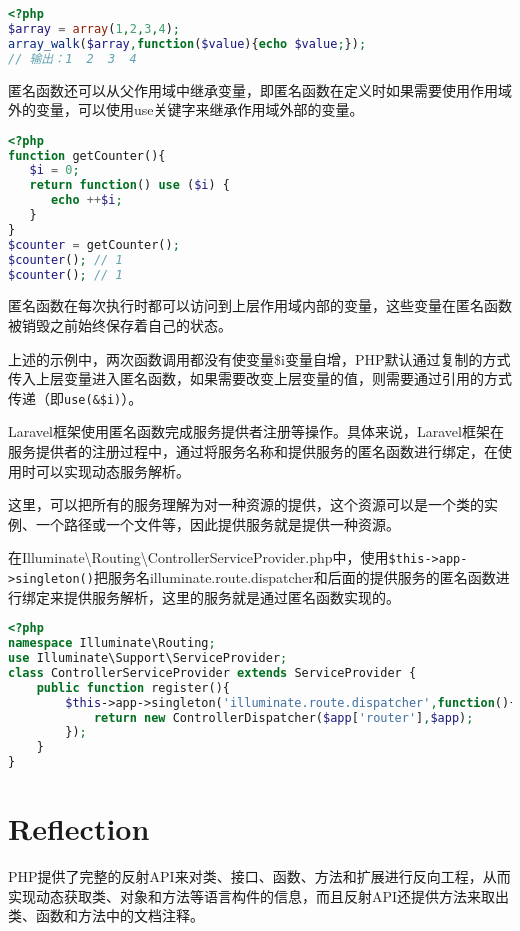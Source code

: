 \begin{lstlisting}[language=PHP]
<?php
$array = array(1,2,3,4);
array_walk($array,function($value){echo $value;});
// 输出：1  2  3  4
\end{lstlisting}

匿名函数还可以从父作用域中继承变量，即匿名函数在定义时如果需要使用作用域外的变量，可以使用use关键字来继承作用域外部的变量。

\begin{lstlisting}[language=PHP]
<?php
function getCounter(){
   $i = 0;
   return function() use ($i) {
      echo ++$i;
   }
}
$counter = getCounter();
$counter(); // 1
$counter(); // 1
\end{lstlisting}

匿名函数在每次执行时都可以访问到上层作用域内部的变量，这些变量在匿名函数被销毁之前始终保存着自己的状态。

上述的示例中，两次函数调用都没有使变量\$i变量自增，PHP默认通过复制的方式传入上层变量进入匿名函数，如果需要改变上层变量的值，则需要通过引用的方式传递（即\texttt{use(\&\$i)}）。

Laravel框架使用匿名函数完成服务提供者注册等操作。具体来说，Laravel框架在服务提供者的注册过程中，通过将服务名称和提供服务的匿名函数进行绑定，在使用时可以实现动态服务解析。

这里，可以把所有的服务理解为对一种资源的提供，这个资源可以是一个类的实例、一个路径或一个文件等，因此提供服务就是提供一种资源。

在Illuminate\textbackslash Routing\textbackslash ControllerServiceProvider.php中，使用\texttt{\$this->app->singleton()}把服务名illuminate.route.dispatcher和后面的提供服务的匿名函数进行绑定来提供服务解析，这里的服务就是通过匿名函数实现的。


\begin{lstlisting}[language=PHP]
<?php
namespace Illuminate\Routing;
use Illuminate\Support\ServiceProvider;
class ControllerServiceProvider extends ServiceProvider {
    public function register(){
        $this->app->singleton('illuminate.route.dispatcher',function(){
            return new ControllerDispatcher($app['router'],$app);
        });
    }
}
\end{lstlisting}


\chapter{Reflection}

PHP提供了完整的反射API来对类、接口、函数、方法和扩展进行反向工程，从而实现动态获取类、对象和方法等语言构件的信息，而且反射API还提供方法来取出类、函数和方法中的文档注释。

